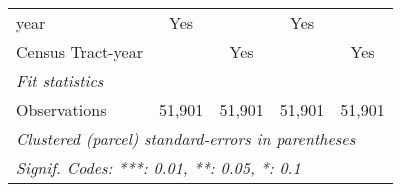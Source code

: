 \begin{table}[htbp]
\begin{tabular}{lcccc}
      year                       & Yes           &                                     & Yes                       & \\  
      Census Tract-year          &               & Yes                                 &                           & Yes\\  
      \midrule
      \emph{Fit statistics}\\
      Observations               & 51,901        & 51,901                              & 51,901                    & 51,901\\  
      \midrule \midrule
      \multicolumn{5}{l}{\emph{Clustered (parcel) standard-errors in parentheses}}\\
      \multicolumn{5}{l}{\emph{Signif. Codes: ***: 0.01, **: 0.05, *: 0.1}}\\
   \end{tabular}
\end{table}